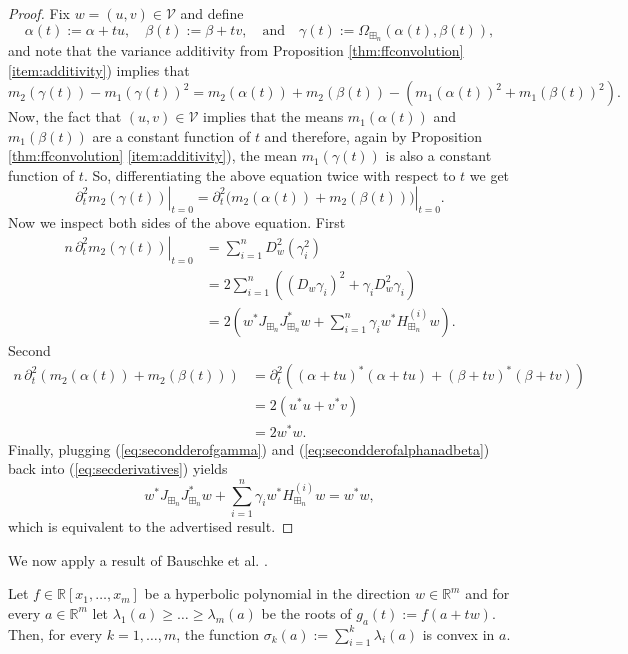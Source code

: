 \documentclass[12pt]{amsart}
\newcommand{\bR}{\mathbb{R}}
\newcommand{\calV}{\mathcal{V}}
\newcommand{\jac}{J_{\boxplus_n}}
\newcommand{\roots}{\Omega_{\boxplus_n}}
\newcommand{\hessconv}{H_{\boxplus_n}^{(i)}}
\begin{document}
\begin{proof}
Fix $w=(u, v)\in \calV$ and define 
$$\alpha(t):= \alpha+ tu, \quad \beta(t):=\beta+tv,  \quad \text{and}\quad  \gamma(t):=\roots(\alpha(t), \beta(t)),$$ and note that the variance additivity  from Proposition \ref{thm:ffconvolution} \ref{item:additivity}) implies that
$$m_2(\gamma(t))-m_1(\gamma(t))^2 = m_2(\alpha(t))+ m_2(\beta(t))-(m_1(\alpha(t))^2+m_1(\beta(t))^2). $$
Now, the fact that $(u,v)\in \calV$  implies that the means $m_1(\alpha(t))$ and $m_1(\beta(t))$ are a constant function of $t$ and therefore, again by Proposition \ref{thm:ffconvolution} \ref{item:additivity}), the mean $m_1(\gamma(t))$ is also a constant function of $t$. So, differentiating the above equation twice with respect to $t$ we get
\begin{equation}
\label{eq:secderivatives}
 \left.\partial_t^2 m_2(\gamma(t))\right|_{t=0} = \left.\partial_t^2 \big(m_2(\alpha(t))+m_2(\beta(t))\big)\right|_{t=0} .
 \end{equation}
Now we inspect both sides of the above equation. First
\begin{align}
\nonumber \left. n\, \partial_t^2m_2(\gamma(t))\right|_{t=0} & = \sum_{i=1}^n D_w^2(\gamma_i^2) 
\\ \nonumber & = 2\sum_{i=1}^n \left( (D_w\gamma_i)^2+ \gamma_iD_w^2\gamma_i\right)
\\ \label{eq:secondderofgamma} & = 2\left(w^* \jac \jac^* w+ \sum_{i=1}^n\gamma_i w^* \hessconv w \right). 
\end{align}
Second
\begin{align}
\nonumber n\,\partial_t^2(m_2(\alpha(t))+m_2(\beta(t))) & = \partial_t^2((\alpha+tu)^*(\alpha+tu)+(\beta+tv)^*(\beta+tv)) 
 \\ \nonumber & = 2(u^*u +v^*v) 
 \\ \label{eq:secondderofalphanadbeta} & = 2w^* w.
 \end{align}
Finally, plugging (\ref{eq:secondderofgamma}) and (\ref{eq:secondderofalphanadbeta}) back into (\ref{eq:secderivatives}) yields 
$$w^* \jac \jac^* w+ \sum_{i=1}^n\gamma_i w^* \hessconv w = w^* w,$$
which is equivalent to the advertised result. 
\end{proof}


We now apply a result of Bauschke et al. \cite[Corollary 3.3]{bauschke2001hyperbolic}.

\begin{theorem}[Bauschke et al.]
\label{thm:convexity}
    Let $f\in \bR[x_1, \dots, x_m]$ be a hyperbolic polynomial in the direction $w\in \bR^m$ and for every $a\in \bR^m$ let $\lambda_1(a)\geq  \dots\geq  \lambda_m(a)$ be the roots of $g_a(t):=f(a+tw)$.  Then, for every $k=1, \dots, m$, the function $\sigma_k(a) := \sum_{i=1}^k \lambda_i(a)$ is convex in $a$. 
\end{theorem}
\end{document}
